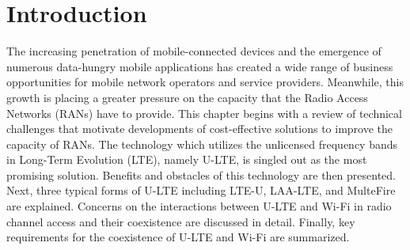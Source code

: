 %
%
%
\chapter{Introduction}
\label{intro} 


The increasing penetration of mobile-connected devices and the emergence of numerous data-hungry mobile applications has created a wide range of business opportunities for mobile network operators and service providers. Meanwhile, this growth is placing a greater pressure on the capacity that the Radio Access Networks (RANs) have to provide. This chapter begins with a review of technical challenges that motivate developments of cost-effective solutions to improve the capacity of RANs. The technology which utilizes the unlicensed frequency bands in Long-Term Evolution (LTE), namely U-LTE, is singled out as the most promising solution. Benefits and obstacles of this technology are then presented. Next, three typical forms of U-LTE including LTE-U, LAA-LTE, and MulteFire are explained. Concerns on the interactions between U-LTE and Wi-Fi in radio channel access and their coexistence are discussed in detail. Finally, key requirements for the coexistence of U-LTE and Wi-Fi are summarized.


